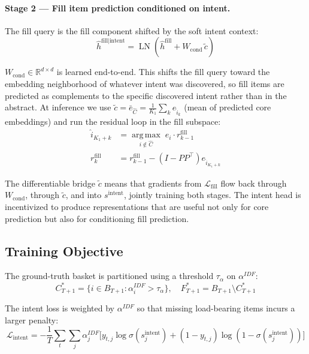 \documentclass[conference]{IEEEtran}
\begin{document}
\paragraph{Stage 2 --- Fill item prediction conditioned on intent.}
The fill query is the fill component shifted by the soft intent context:
\begin{equation}
\hat{h}^{\text{fill} \mid \text{intent}} = \operatorname{LN}\!\left(\hat{h}^{\text{fill}} + W_{\text{cond}}\, \tilde{c}\right)
\end{equation}

$W_{\text{cond}} \in \mathbb{R}^{d \times d}$ is learned end-to-end.
This shifts the fill query toward the embedding neighborhood of
whatever intent was discovered, so fill items are predicted as
complements to the specific discovered intent rather than in the
abstract. At inference we use $\tilde{c} = \bar{e}_{\hat{C}} =
\frac{1}{K_1}\sum_{k} e_{\hat{i}_k}$ (mean of predicted core
embeddings) and run the residual loop in the fill subspace:
\begin{align}
\hat{i}_{K_1+k} &= \operatorname*{arg\,max}_{i \notin \hat{C}}\; e_i \cdot r_{k-1}^{\text{fill}} \\
r_k^{\text{fill}} &= r_{k-1}^{\text{fill}} - (I - PP^\top) e_{\hat{i}_{K_1+k}}
\end{align}

The differentiable bridge $\tilde{c}$ means that gradients from
$\mathcal{L}_{\text{fill}}$ flow back through $W_{\text{cond}}$,
through $\tilde{c}$, and into $s^{\text{intent}}$, jointly training
both stages. The intent head is incentivized to produce representations
that are useful not only for core prediction but also for conditioning
fill prediction.

\subsection{Training Objective}

The ground-truth basket is partitioned using a threshold $\tau_\alpha$
on $\alpha^{IDF}$:
\begin{equation}
C^*_{T+1} = \{i \in B_{T+1} : \alpha_i^{IDF} > \tau_\alpha\},\quad
F^*_{T+1} = B_{T+1} \setminus C^*_{T+1}
\end{equation}

The intent loss is weighted by $\alpha^{IDF}$ so that missing
load-bearing items incurs a larger penalty:
\begin{equation}
\mathcal{L}_{\text{intent}} = -\frac{1}{T}\sum_t \sum_j \alpha_j^{IDF}
  \bigl[y_{t,j}\log\sigma(s_j^{\text{intent}})
       + (1-y_{t,j})\log(1-\sigma(s_j^{\text{intent}}))\bigr]
\end{equation}
\end{document}
